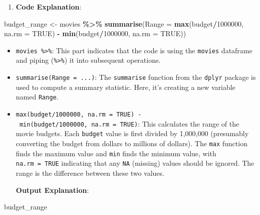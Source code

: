 \documentclass[
]{book}
\newenvironment{Shaded}{\begin{snugshade}}{\end{snugshade}}
\newcommand{\AttributeTok}[1]{\textcolor[rgb]{0.13,0.29,0.53}{#1}}
\newcommand{\ConstantTok}[1]{\textcolor[rgb]{0.56,0.35,0.01}{#1}}
\newcommand{\DecValTok}[1]{\textcolor[rgb]{0.00,0.00,0.81}{#1}}
\newcommand{\FunctionTok}[1]{\textcolor[rgb]{0.13,0.29,0.53}{\textbf{#1}}}
\newcommand{\NormalTok}[1]{#1}
\newcommand{\OtherTok}[1]{\textcolor[rgb]{0.56,0.35,0.01}{#1}}
\newcommand{\SpecialCharTok}[1]{\textcolor[rgb]{0.81,0.36,0.00}{\textbf{#1}}}
\providecommand{\tightlist}{%
  \setlength{\itemsep}{0pt}\setlength{\parskip}{0pt}}
\begin{document}
\begin{enumerate}
\def\labelenumi{\arabic{enumi}.}
\tightlist
\item
  \textbf{Code Explanation}:
\end{enumerate}

\begin{Shaded}
\begin{Highlighting}[]
\NormalTok{budget\_range }\OtherTok{\textless{}{-}}\NormalTok{ movies }\SpecialCharTok{\%\textgreater{}\%}
  \FunctionTok{summarise}\NormalTok{(}\AttributeTok{Range =} \FunctionTok{max}\NormalTok{(budget}\SpecialCharTok{/}\DecValTok{1000000}\NormalTok{, }
                        \AttributeTok{na.rm =} \ConstantTok{TRUE}\NormalTok{) }\SpecialCharTok{{-}} \FunctionTok{min}\NormalTok{(budget}\SpecialCharTok{/}\DecValTok{1000000}\NormalTok{,}
                                            \AttributeTok{na.rm =} \ConstantTok{TRUE}\NormalTok{))}
\end{Highlighting}
\end{Shaded}

\begin{itemize}
\item
  \texttt{movies\ \%\textgreater{}\%}: This part indicates that the code is using the \texttt{movies} dataframe and piping (\texttt{\%\textgreater{}\%}) it into subsequent operations.
\item
  \texttt{summarise(Range\ =\ ...)}: The \texttt{summarise} function from the \texttt{dplyr} package is used to compute a summary statistic. Here, it's creating a new variable named \texttt{Range}.
\item
  \texttt{max(budget/1000000,\ na.rm\ =\ TRUE)\ -\ min(budget/1000000,\ na.rm\ =\ TRUE)}: This calculates the range of the movie budgets. Each \texttt{budget} value is first divided by 1,000,000 (presumably converting the budget from dollars to millions of dollars). The \texttt{max} function finds the maximum value and \texttt{min} finds the minimum value, with \texttt{na.rm\ =\ TRUE} indicating that any \texttt{NA} (missing) values should be ignored. The range is the difference between these two values.

  \textbf{Output Explanation}:
\end{itemize}

\begin{Shaded}
\begin{Highlighting}[]
\NormalTok{budget\_range}
\end{Highlighting}
\end{Shaded}
\end{document}
